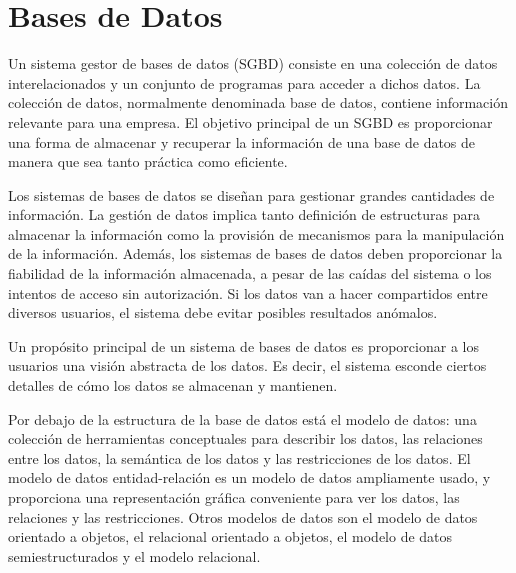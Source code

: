 \thispagestyle{plain}
	\section{Bases de Datos}
		\par 
			Un sistema gestor de bases de datos (SGBD) consiste en una colección de datos interelacionados y un conjunto de programas para acceder a dichos datos. La colección de datos, normalmente denominada base de datos, contiene información relevante para una empresa. El objetivo principal de un SGBD es proporcionar una forma de almacenar y recuperar la información de una base de datos de manera que sea tanto práctica como eficiente.
			
		\par \noindent
			Los sistemas de bases de datos se diseñan para gestionar grandes cantidades de información. La gestión de datos implica tanto definición de estructuras para almacenar la información como la provisión de mecanismos para la manipulación de la información. Además, los sistemas de bases de datos deben proporcionar la fiabilidad de la información almacenada, a pesar de las caídas del sistema o los intentos de acceso sin autorización. Si los datos van a hacer compartidos entre diversos usuarios, el sistema debe evitar posibles resultados anómalos.
			
		\par \noindent
			Un propósito principal de un sistema de bases de datos
			es proporcionar a los usuarios una visión abstracta de
			los datos. Es decir, el sistema esconde ciertos detalles
			de cómo los datos se almacenan y mantienen.
			
		\par \noindent
			Por debajo de la estructura de la base de datos está el
			modelo de datos: una colección de herramientas conceptuales para describir los datos, las relaciones entre
			los datos, la semántica de los datos y las restricciones
			de los datos. El modelo de datos entidad-relación es un
			modelo de datos ampliamente usado, y proporciona una
			representación gráfica conveniente para ver los datos,
			las relaciones y las restricciones. Otros modelos de datos son el modelo de datos orientado a objetos, el relacional orientado
			a objetos, el modelo de datos semiestructurados y el modelo relacional.
			
		
		
		